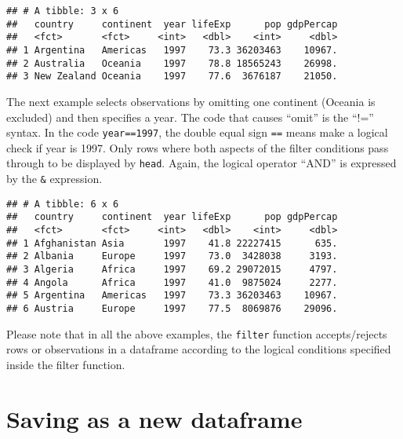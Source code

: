 \documentclass[
]{book}
\newenvironment{Shaded}{\begin{snugshade}}{\end{snugshade}}
\newcommand{\DecValTok}[1]{\textcolor[rgb]{0.00,0.00,0.81}{#1}}
\newcommand{\KeywordTok}[1]{\textcolor[rgb]{0.13,0.29,0.53}{\textbf{#1}}}
\newcommand{\NormalTok}[1]{#1}
\newcommand{\OperatorTok}[1]{\textcolor[rgb]{0.81,0.36,0.00}{\textbf{#1}}}
\newcommand{\StringTok}[1]{\textcolor[rgb]{0.31,0.60,0.02}{#1}}
\begin{document}
\begin{verbatim}
## # A tibble: 3 x 6
##   country     continent  year lifeExp      pop gdpPercap
##   <fct>       <fct>     <int>   <dbl>    <int>     <dbl>
## 1 Argentina   Americas   1997    73.3 36203463    10967.
## 2 Australia   Oceania    1997    78.8 18565243    26998.
## 3 New Zealand Oceania    1997    77.6  3676187    21050.
\end{verbatim}

The next example selects observations by omitting one continent (Oceania is excluded) and then specifies a year. The code that causes ``omit'' is the ``!='' syntax. In the code \texttt{year==1997}, the double equal sign \texttt{==} means make a logical check if year is 1997. Only rows where both aspects of the filter conditions pass through to be displayed by \texttt{head}. Again, the logical operator ``AND'' is expressed by the \texttt{\&} expression.

\begin{Shaded}
\end{Shaded}

\begin{verbatim}
## # A tibble: 6 x 6
##   country     continent  year lifeExp      pop gdpPercap
##   <fct>       <fct>     <int>   <dbl>    <int>     <dbl>
## 1 Afghanistan Asia       1997    41.8 22227415      635.
## 2 Albania     Europe     1997    73.0  3428038     3193.
## 3 Algeria     Africa     1997    69.2 29072015     4797.
## 4 Angola      Africa     1997    41.0  9875024     2277.
## 5 Argentina   Americas   1997    73.3 36203463    10967.
## 6 Austria     Europe     1997    77.5  8069876    29096.
\end{verbatim}

Please note that in all the above examples, the \texttt{filter} function accepts/rejects rows or observations in a dataframe according to the logical conditions specified inside the filter function.

\hypertarget{saving-as-a-new-dataframe}{%
\section{Saving as a new dataframe}\label{saving-as-a-new-dataframe}}
\end{document}
